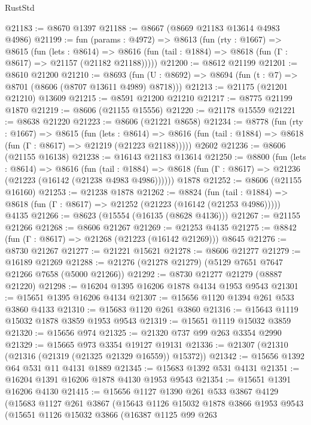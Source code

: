 \begin{lexlean}{RustStd}
\begin{coremodule}
@21183 := @8670 @1397
@21188 := @8667 (@8669 @21183 @13614 @4983 @4986)
@21199 := fun (params : @4972) =>
  @8613
    (fun (rty : @1667) =>
    @8615
      (fun (lets : @8614) =>
      @8616 (fun (tail : @1884) => @8618 (fun (Γ : @8617) => @21157 (@21182 @21188)))))
@21200 := @8612 @21199
@21201 := @8610 @21200
@21210 := @8693
    (fun (U : @8692) => @8694 (fun (t : @7) => @8701 (@8606 (@8707 @13611 @4989) @8718)))
@21213 := @21175 (@21201 @21210) @13609
@21215 := @8591 @21200 @21210
@21217 := @8775 @21199 @1870
@21219 := @8606 (@21155 @15556)
@21220 := @21178 @15559
@21221 := @8638 @21220
@21223 := @8606 (@21221 @8658)
@21234 := @8778
    (fun (rty : @1667) =>
    @8615
      (fun (lets : @8614) =>
      @8616 (fun (tail : @1884) => @8618 (fun (Γ : @8617) => @21219 (@21223 @21188)))))
    @2602
@21236 := @8606 (@21155 @16138)
@21238 := @16143 @21183 @13614
@21250 := @8800
    (fun (lets : @8614) =>
    @8616
      (fun (tail : @1884) =>
      @8618 (fun (Γ : @8617) => @21236 (@21223 (@16142 (@21238 @4983 @4986))))))
    @1878
@21252 := @8606 (@21155 @16160)
@21253 := @21238 @1878
@21262 := @8824
    (fun (tail : @1884) => @8618 (fun (Γ : @8617) => @21252 (@21223 (@16142 (@21253 @4986)))))
    @4135
@21266 := @8623 (@15554 (@16135 (@8628 @4136)))
@21267 := @21155 @21266
@21268 := @8606 @21267
@21269 := @21253 @4135
@21275 := @8842 (fun (Γ : @8617) => @21268 (@21223 (@16142 @21269))) @8645
@21276 := @8730 @21267
@21277 := @21221 @15621
@21278 := @8606 @21277
@21279 := @16189 @21269
@21288 := @21276 (@21278 @21279) (@5129 @7651 @7647 @21266 @7658 (@5000 @21266))
@21292 := @8730 @21277 @21279 (@8887 @21220)
@21298 := @16204 @1395 @16206 @1878 @4134 @1953 @9543
@21301 := @15651 @1395 @16206 @4134
@21307 := @15656 @1120 @1394 @261 @533 @3860 @4133
@21310 := @15683 @1120 @261 @3860
@21316 := @15643 @1119 @15032 @1878 @3859 @1953 @9543
@21319 := @15651 @1119 @15032 @3859
@21320 := @15656 @974
@21325 := @21320 @737 @99 @263 @3354 @2990
@21329 := @15665 @973 @3354 @19127 @19131
@21336 := @21307 (@21310 (@21316 (@21319 (@21325 @21329 @16559)) @15372))
@21342 := @15656 @1392 @64 @531 @11 @4131 @1889
@21345 := @15683 @1392 @531 @4131
@21351 := @16204 @1391 @16206 @1878 @4130 @1953 @9543
@21354 := @15651 @1391 @16206 @4130
@21415 := @15656
    @1127
    @1390
    @261
    @533
    @3867
    @4129
    (@15683
      @1127
      @261
      @3867
      (@15643
        @1126
        @15032
        @1878
        @3866
        @1953
        @9543
        (@15651
          @1126
          @15032
          @3866
          (@16387
            @1125
            @99
            @263

\end{coremodule}
\end{lexlean}
